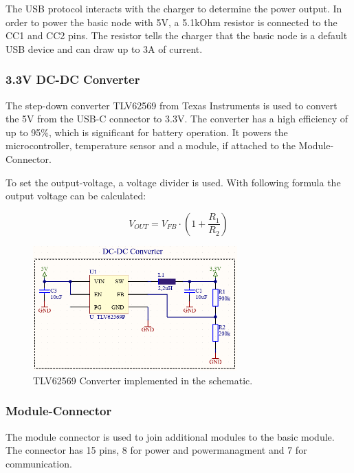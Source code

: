     The USB protocol interacts with the charger to determine the power output. In order to
    power the basic node with 5V, a 5.1kOhm resistor is connected to the CC1 and CC2 pins.
    The resistor tells the charger that the basic node is a default USB device and can draw
    up to 3A of current. 
    \cite{noauthor_fugen_2023}
    
    \subsubsection{3.3V DC-DC Converter}

    The  step-down converter TLV62569 from Texas Instruments is used to convert 
    the 5V from the USB-C connector to 3.3V. The converter has a high efficiency
    of up to 95\%, which is significant for battery operation. It powers the
    microcontroller, temperature sensor and a module, if attached to the
    Module-Connector.

    To set the output-voltage, a voltage divider is used. With following formula
    the output voltage can be calculated:

    \begin{equation}
        V_{OUT} = V_{FB} \cdot (1 + \frac{R_1}{R_2})
    \end{equation}

    \begin{figure}[H]
        \centering
        \includegraphics[width=0.7\textwidth]{assets/HW/DC-DC-schematic.png}
        \caption{TLV62569 Converter implemented in the schematic.}
    \end{figure}

    \subsubsection{Module-Connector}

    The module connector is used to join additional modules to the basic module.
    The connector has 15 pins, 8 for power and powermanagment and 7 for 
    communication. 

